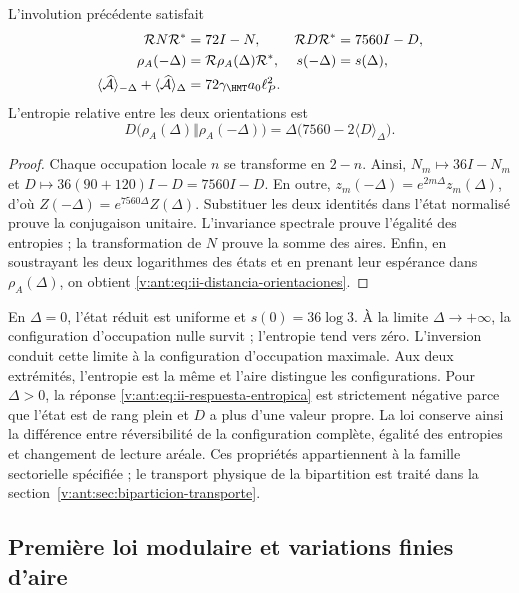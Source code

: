 \begin{theorem}
L'involution précédente satisfait
\begin{align}
 \mathcal R N\mathcal R^*&=72I-N,&
 \mathcal R D\mathcal R^*&=7560I-D,\\
 \rho_A(-\Delta)&=\mathcal R\rho_A(\Delta)\mathcal R^*,&
 s(-\Delta)&=s(\Delta),
 \label{v:ant:eq:ii-inversion-entropia}\\
 \langle\widehat{\mathcal A}\rangle_{-\Delta}
 +\langle\widehat{\mathcal A}\rangle_\Delta
 &=72\gamma_{\HMT}a_0\ell_P^2.&&
 \label{v:ant:eq:ii-area-complementaria}
\end{align}
L'entropie relative entre les deux orientations est
\begin{equation}
 D\bigl(\rho_A(\Delta)\Vert\rho_A(-\Delta)\bigr)
 =\Delta\bigl(7560-2\langle D\rangle_\Delta\bigr).
 \label{v:ant:eq:ii-distancia-orientaciones}
\end{equation}
\end{theorem}
\begin{proof}
Chaque occupation locale $n$ se transforme en $2-n$. Ainsi,
$N_m\mapsto36I-N_m$ et
$D\mapsto36(90+120)I-D=7560I-D$.
En outre, $z_m(-\Delta)=e^{2m\Delta}z_m(\Delta)$,
d'où $Z(-\Delta)=e^{7560\Delta}Z(\Delta)$.
Substituer les deux identités dans l'état normalisé prouve la
conjugaison unitaire. L'invariance spectrale prouve l'égalité
des entropies ; la transformation de $N$ prouve la somme des aires.
Enfin, en soustrayant les deux logarithmes des états et en prenant
leur espérance dans $\rho_A(\Delta)$, on obtient
\eqref{v:ant:eq:ii-distancia-orientaciones}.
\end{proof}

En $\Delta=0$, l’état réduit est uniforme et
$s(0)=36\log3$. À la limite $\Delta\to+\infty$, la configuration
d’occupation nulle survit ; l’entropie tend vers zéro.
L’inversion conduit cette limite à la configuration d’occupation maximale.
Aux deux extrémités, l’entropie est la même et l’aire distingue les
configurations. Pour $\Delta>0$, la réponse
\eqref{v:ant:eq:ii-respuesta-entropica} est strictement négative parce que
l’état est de rang plein et $D$ a plus d’une valeur propre.
La loi conserve ainsi la différence entre réversibilité de la
configuration complète, égalité des entropies et changement de lecture aréale.
Ces propriétés appartiennent à la famille sectorielle spécifiée ;
le transport physique de la bipartition est traité dans
la section~\ref{v:ant:sec:biparticion-transporte}.

\subsection{Première loi modulaire et variations finies d'aire}
\label{v:ant:sec:ii-area-ley-modular}

